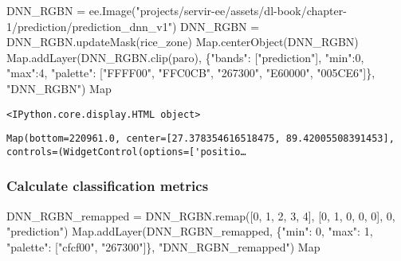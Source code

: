 \documentclass[
  letterpaper,
  DIV=11,
  numbers=noendperiod]{scrreprt}
\newenvironment{Shaded}{\begin{snugshade}}{\end{snugshade}}
\newcommand{\DecValTok}[1]{\textcolor[rgb]{0.68,0.00,0.00}{#1}}
\newcommand{\NormalTok}[1]{\textcolor[rgb]{0.00,0.23,0.31}{#1}}
\newcommand{\OperatorTok}[1]{\textcolor[rgb]{0.37,0.37,0.37}{#1}}
\newcommand{\StringTok}[1]{\textcolor[rgb]{0.13,0.47,0.30}{#1}}
\begin{document}
\begin{Shaded}
\begin{Highlighting}[]
\NormalTok{DNN\_RGBN }\OperatorTok{=}\NormalTok{ ee.Image(}\StringTok{"projects/servir{-}ee/assets/dl{-}book/chapter{-}1/prediction/prediction\_dnn\_v1"}\NormalTok{)}
\NormalTok{DNN\_RGBN }\OperatorTok{=}\NormalTok{ DNN\_RGBN.updateMask(rice\_zone)}
\NormalTok{Map.centerObject(DNN\_RGBN)}
\NormalTok{Map.addLayer(DNN\_RGBN.clip(paro), \{}\StringTok{"bands"}\NormalTok{: [}\StringTok{"prediction"}\NormalTok{], }\StringTok{"min"}\NormalTok{:}\DecValTok{0}\NormalTok{, }\StringTok{"max"}\NormalTok{:}\DecValTok{4}\NormalTok{, }\StringTok{"palette"}\NormalTok{: [}\StringTok{"FFFF00"}\NormalTok{, }\StringTok{"FFC0CB"}\NormalTok{, }\StringTok{"267300"}\NormalTok{, }\StringTok{"E60000"}\NormalTok{, }\StringTok{"005CE6"}\NormalTok{]\}, }\StringTok{"DNN\_RGBN"}\NormalTok{)}
\NormalTok{Map}
\end{Highlighting}
\end{Shaded}

\begin{verbatim}
<IPython.core.display.HTML object>
\end{verbatim}

\begin{verbatim}
Map(bottom=220961.0, center=[27.378354616518475, 89.42005508391453], controls=(WidgetControl(options=['positio…
\end{verbatim}

\subsubsection{Calculate classification
metrics}\label{calculate-classification-metrics-1}

\begin{Shaded}
\begin{Highlighting}[]
\NormalTok{DNN\_RGBN\_remapped }\OperatorTok{=}\NormalTok{ DNN\_RGBN.remap([}\DecValTok{0}\NormalTok{, }\DecValTok{1}\NormalTok{, }\DecValTok{2}\NormalTok{, }\DecValTok{3}\NormalTok{, }\DecValTok{4}\NormalTok{], [}\DecValTok{0}\NormalTok{, }\DecValTok{1}\NormalTok{, }\DecValTok{0}\NormalTok{, }\DecValTok{0}\NormalTok{, }\DecValTok{0}\NormalTok{], }\DecValTok{0}\NormalTok{, }\StringTok{"prediction"}\NormalTok{)}
\NormalTok{Map.addLayer(DNN\_RGBN\_remapped, \{}\StringTok{"min"}\NormalTok{: }\DecValTok{0}\NormalTok{, }\StringTok{"max"}\NormalTok{: }\DecValTok{1}\NormalTok{, }\StringTok{"palette"}\NormalTok{: [}\StringTok{"cfcf00"}\NormalTok{, }\StringTok{"267300"}\NormalTok{]\}, }\StringTok{"DNN\_RGBN\_remapped"}\NormalTok{)}
\NormalTok{Map}
\end{Highlighting}
\end{Shaded}
\end{document}
